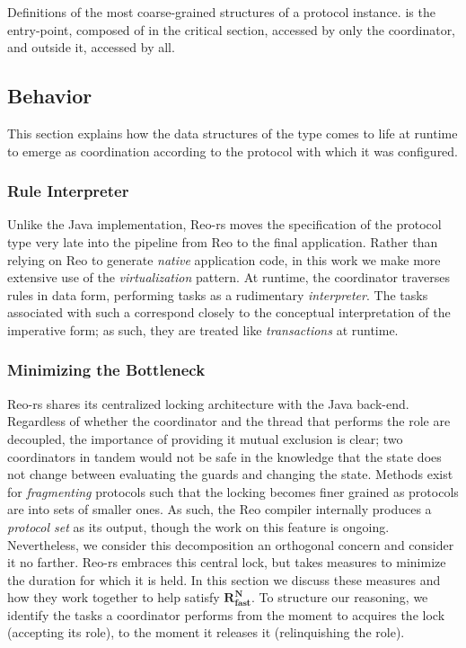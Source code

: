 \begin{listing}[ht]
	\centering
	\inputminted{rust}{proto.rs}
	\caption[Proto type with parts inside and outside the lock.]{Definitions of the most coarse-grained structures of a protocol instance.  is the entry-point, composed of  in the critical section, accessed by only the coordinator, and  outside it, accessed by all.}
	\label{listing:proto}
\end{listing}


\subsection{Behavior}
\label{sec:behavior_implementation}
This section explains how the data structures of the  type comes to life at runtime to emerge as coordination according to the protocol with which it was configured. 

\subsubsection{Rule Interpreter}
Unlike the Java implementation, Reo-rs moves the specification of the protocol type very late into the pipeline from Reo to the final application. Rather than relying on Reo to generate \textit{native} application code, in this work we make more extensive use of the \textit{virtualization} pattern. At runtime, the coordinator traverses rules in data form, performing tasks as a rudimentary \textit{interpreter}. The tasks associated with such a  correspond closely to the conceptual interpretation of the imperative form; as such, they are treated like \textit{transactions} at runtime. 


\subsubsection{Minimizing the Bottleneck}
\label{sec:minimizing_the_bottleneck}
Reo-rs shares its centralized locking architecture with the Java back-end. Regardless of whether the coordinator and the thread that performs the role are decoupled, the importance of providing it mutual exclusion is clear; two coordinators in tandem would not be safe in the knowledge that the state does not change between evaluating the guards and changing the state. Methods exist for \textit{fragmenting} protocols such that the locking becomes finer grained as protocols are into sets of smaller ones. As such, the Reo compiler internally produces a \textit{protocol set} as its output, though the work on this feature is ongoing. Nevertheless, we consider this decomposition an orthogonal concern and consider it no farther. Reo-rs embraces this central lock, but takes measures to minimize the duration for which it is held. In this section we discuss these measures and how they work together to help satisfy $\boldsymbol{R^N_{fast}}$. To structure our reasoning, we identify the tasks a coordinator performs from the moment to acquires the lock (accepting its role), to the moment it releases it (relinquishing the role). 


